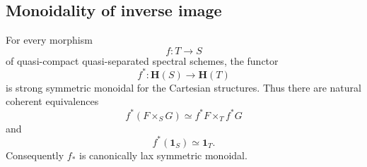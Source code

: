 \subsection{Monoidality of inverse image}

\begin{theorem}
\label{thm:motivic-inverse-image-symmetric-monoidal}
For every morphism
\[
    f
    \colon
    T
    \longrightarrow
    S
\]
of quasi-compact quasi-separated spectral schemes, the functor
\[
    f^*
    \colon
    \mathbf H(S)
    \longrightarrow
    \mathbf H(T)
\]
is strong symmetric monoidal for the Cartesian structures. Thus there
are natural coherent equivalences
\[
    f^*(F\times_SG)
    \simeq
    f^*F\times_Tf^*G
\]
and
\[
    f^*(\mathbf 1_S)
    \simeq
    \mathbf 1_T.
\]
Consequently \(f_*\) is canonically lax symmetric monoidal.
\end{theorem}

